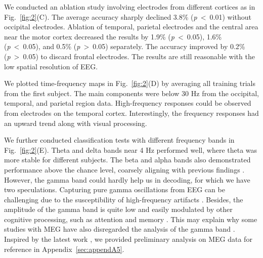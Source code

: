 We conducted an ablation study involving electrodes from different cortices as in Fig.~\ref{fig:2}(C).
The average accuracy sharply declined 3.8\% (\textit{p}\ \textless\ 0.01) without occipital electrodes.
Ablation of temporal, parietal electrodes and the central area near the motor cortex decreased the results by 1.9\% (\textit{p}\ \textless\ 0.05),
1.6\% (\textit{p}\ \textless\ 0.05), and 0.5\% (\textit{p}\ \textgreater\ 0.05) separately.
The accuracy improved by 0.2\% (\textit{p}\ \textgreater\ 0.05) to discard frontal electrodes.
The results are still reasonable with the low spatial resolution of EEG.

We plotted time-frequency maps in Fig.~\ref{fig:2}(D) by averaging all training trials from the first subject.
The main components were below 30 Hz from the occipital, temporal, and parietal region data.
High-frequency responses could be observed from electrodes on the temporal cortex.
Interestingly, the frequency responses had an upward trend along with visual processing. 

We further conducted classification tests with different frequency bands in Fig.~\ref{fig:2}(E).
Theta and delta bands near 4 Hz performed well, where theta was more stable for different subjects.
The beta and alpha bands also demonstrated performance above the chance level, coarsely aligning with previous findings \citep{bastos2015visual, michalareas2016alphabeta}.
However, the gamma band could hardly help us in decoding, for which we have two speculations. 
Capturing pure gamma oscillations from EEG can be challenging due to the susceptibility of high-frequency artifacts \citep{fries2008finding, yuval-greenberg2008transient}.
Besides, the amplitude of the gamma band is quite low and easily modulated by other cognitive processing, such as attention and memory \citep{herrmann2005human}.
This may explain why some studies with MEG have also disregarded the analysis of the gamma band \citep{hebart2023thingsdata}. 
Inspired by the latest work \cite{benchetrit2023brain}, we provided preliminary analysis on MEG data for reference in Appendix~\ref{sec:appendA5}.


